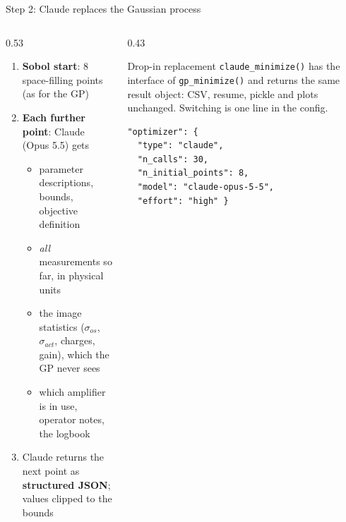 \documentclass[aspectratio=169,10pt]{beamer}
\begin{document}
\begin{frame}[fragile]{Step 2: Claude replaces the Gaussian process}
  \begin{columns}[T]
    \begin{column}{0.53\textwidth}
      \begin{enumerate}\small
        \item \textbf{Sobol start}: 8 space-filling points (as for the GP)
        \item \textbf{Each further point}: Claude (Opus 5.5) gets
          \begin{itemize}\scriptsize
            \item parameter descriptions, bounds, objective definition
            \item \emph{all} measurements so far, in physical units
            \item the image statistics ($\sigma_{os}$, $\sigma_{act}$, charges, gain),
                  which the GP never sees
            \item which amplifier is in use, operator notes, the logbook
          \end{itemize}
        \item Claude returns the next point as \textbf{structured JSON};
              values clipped to the bounds
      \end{enumerate}
    \end{column}
    \begin{column}{0.43\textwidth}
      \begin{block}{Drop-in replacement}
        \scriptsize \texttt{claude\_minimize()} has the interface of
        \texttt{gp\_minimize()} and returns the same result object: CSV, resume,
        pickle and plots unchanged. Switching is one line in the config.
      \end{block}
      \vspace{1mm}
\begin{lstlisting}
"optimizer": {
  "type": "claude",
  "n_calls": 30,
  "n_initial_points": 8,
  "model": "claude-opus-5-5",
  "effort": "high" }
\end{lstlisting}
    \end{column}
  \end{columns}
\end{frame}
\end{document}
